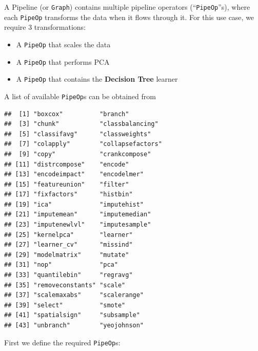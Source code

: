 \documentclass[]{article}
\newenvironment{Shaded}{\begin{snugshade}}{\end{snugshade}}
\newcommand{\DataTypeTok}[1]{\textcolor[rgb]{0.13,0.29,0.53}{#1}}
\newcommand{\KeywordTok}[1]{\textcolor[rgb]{0.13,0.29,0.53}{\textbf{#1}}}
\newcommand{\NormalTok}[1]{#1}
\newcommand{\OperatorTok}[1]{\textcolor[rgb]{0.81,0.36,0.00}{\textbf{#1}}}
\newcommand{\StringTok}[1]{\textcolor[rgb]{0.31,0.60,0.02}{#1}}
\providecommand{\tightlist}{%
  \setlength{\itemsep}{0pt}\setlength{\parskip}{0pt}}
\renewenvironment{Shaded} {\begin{snugshade}\small} {\end{snugshade}}
\begin{document}
A Pipeline (or \texttt{Graph}) contains multiple pipeline operators (``\texttt{PipeOp}''s), where each \texttt{PipeOp} transforms the data when it flows through it.
For this use case, we require 3 transformations:

\begin{itemize}
\tightlist
\item
  A \texttt{PipeOp} that scales the data
\item
  A \texttt{PipeOp} that performs PCA
\item
  A \texttt{PipeOp} that contains the \textbf{Decision Tree} learner
\end{itemize}

A list of available \texttt{PipeOp}s can be obtained from

\begin{Shaded}
\end{Shaded}

\begin{verbatim}
##  [1] "boxcox"          "branch"         
##  [3] "chunk"           "classbalancing" 
##  [5] "classifavg"      "classweights"   
##  [7] "colapply"        "collapsefactors"
##  [9] "copy"            "crankcompose"   
## [11] "distrcompose"    "encode"         
## [13] "encodeimpact"    "encodelmer"     
## [15] "featureunion"    "filter"         
## [17] "fixfactors"      "histbin"        
## [19] "ica"             "imputehist"     
## [21] "imputemean"      "imputemedian"   
## [23] "imputenewlvl"    "imputesample"   
## [25] "kernelpca"       "learner"        
## [27] "learner_cv"      "missind"        
## [29] "modelmatrix"     "mutate"         
## [31] "nop"             "pca"            
## [33] "quantilebin"     "regravg"        
## [35] "removeconstants" "scale"          
## [37] "scalemaxabs"     "scalerange"     
## [39] "select"          "smote"          
## [41] "spatialsign"     "subsample"      
## [43] "unbranch"        "yeojohnson"
\end{verbatim}

First we define the required \texttt{PipeOp}s:

\begin{Shaded}
\end{Shaded}
\end{document}
